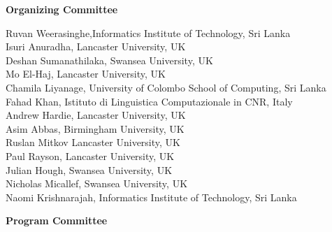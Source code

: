 \documentclass[11pt,a4paper]{article}
\begin{document}
\begin{center}
  {\Large \textbf{Organizing Committee}}
\end{center}

Ruvan Weerasinghe,Informatics Institute of Technology, Sri Lanka \\
Isuri Anuradha, Lancaster University, UK \\
Deshan Sumanathilaka, Swansea University, UK \\
Mo El-Haj, Lancaster University, UK \\
Chamila Liyanage, University of Colombo School of Computing, Sri Lanka \\
Fahad Khan, Istituto di Linguistica Computazionale in CNR, Italy \\
Andrew Hardie, Lancaster University, UK \\
Asim Abbas, Birmingham University, UK \\
Ruslan Mitkov Lancaster University, UK \\
Paul Rayson, Lancaster University, UK \\
Julian Hough, Swansea University, UK \\
Nicholas Micallef, Swansea University, UK \\
Naomi Krishnarajah, Informatics Institute of Technology, Sri Lanka \\


\newpage
\begin{center}
  {\Large \textbf{Program Committee}}
\end{center}
\end{document}
